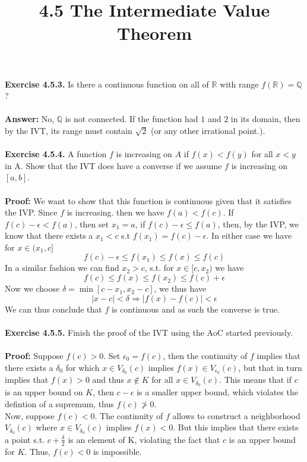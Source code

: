 \documentclass{article}
\title{\textbf{4.5 The Intermediate Value Theorem}}
\begin{document}
	\maketitle
	\textbf{Exercise 4.5.3.} Is there a continuous function on all of $\mathbb{R}$ with range $f(\mathbb{R}) = \mathbb{Q}$? \\ \\
	\textbf{Answer:} No, $\mathbb{Q}$ is not connected. If the function had $1$ and $2$ in its domain, then by the IVT, its range must contain $\sqrt{2}$ (or any other irrational point.). \\ \\
	\textbf{Exercise 4.5.4.} A function $f$ is increasing on $A$ if $f(x) < f(y)$ for all $x < y$ in A. Show that the IVT does have a converse if we assume $f$ is increasing on $[a, b]$. \\ \\
	\textbf{Proof:} We want to show that this function is continuous given that it satisfies the IVP. Since $f$ is increasing. then we have $f(a) < f(c)$. If $f(c) - \epsilon < f(a)$, then set $x_1 = a$, if $f(c) - \epsilon \leq f(a)$, then, by the IVP, we know that there exists a $x_1 < c$ s.t $f(x_1) = f(c) - \epsilon$. In either case we have for $x \in (x_1, c]$
		$$f(c) - \epsilon \leq f(x_1) \leq f(x) \leq f(c)$$
	In a similar fashion we can find $x_2 > c$, s.t. for $x \in [c, x_2)$ we have
		$$f(c) \leq f(x) \leq f(x_2) \leq f(c) + \epsilon$$
	Now we choose $\delta = \min[c - x_1, x_2 - c]$, we thus have
		$$|x - c| < \delta \Longrightarrow |f(x) - f(c)| < \epsilon$$
	We can thus conclude that $f$ is continuous and as such the converse is true. \\ \\
	\textbf{Exercise 4.5.5.} Finish the proof of the IVT using the AoC started previously.\\ \\
	\textbf{Proof:} Suppose $f(c) > 0$. Set $\epsilon_0 = f(c)$, then the continuity of $f$ implies that there exists a $\delta_0$ for which $x \in V_{\delta_0}(c)$ implies $f(x) \in V_{\epsilon_0}(c)$, but that in turn implies that $f(x) > 0$ and thus $x \not \in K$ for all $x \in V_{\delta_0}(c)$. This means that if $c$ is an upper bound on $K$, then $c - \epsilon$ is a smaller upper bound, which violates the defintion of a supremum, thus $f(c) \not > 0$. \\
	Now, suppose $f(c) < 0$. The continuity of $f$ allows to construct a neighborhood $V_{\delta_0}(c)$ where $x \in V_{\delta_0}(c)$ implies $f(x) <  0$. But this implies that there exists a point s.t. $c + \frac{\delta}{2}$ is an element of K, violating the fact that $c$ is an upper bound for $K$. Thus, $f(c) < 0$ is impossible. \\
\end{document}
